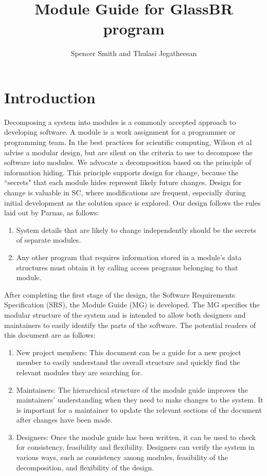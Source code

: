 \documentclass[12pt]{article}
\title{Module Guide for GlassBR program}
\author{Spencer Smith and Thulasi Jegatheesan}
\begin{document}
\maketitle
\tableofcontents
\newpage
\section{Introduction}
\label{Sec:I}
Decomposing a system into modules is a commonly accepted approach to developing software.  A module is a work assignment for a programmer or programming team. In the best practices for scientific computing, Wilson et al advise a modular design, but are silent on the criteria to use to decompose the software into modules.  We advocate a decomposition based on the principle of information hiding. This principle supports design for change, because the ``secrets" that each module hides represent likely future changes.  Design for change is valuable in SC, where modifications are frequent, especially during initial development as the solution space is explored.
Our design follows the rules laid out by Parnas, as follows:
\begin{enumerate}
\item{System details that are likely to change independently should be the secrets of separate modules.}
\item{Any other program that requires information stored in a module's data structures must obtain it by calling access programs belonging to that module.}
\end{enumerate}
After completing the first stage of the design, the Software Requirements Specification (SRS), the Module Guide (MG) is developed. The MG specifies the modular structure of the system and is intended to allow both designers and maintainers to easily identify the parts of the software.  The potential readers of this document are as follows:
\begin{enumerate}
\item{New project members: This document can be a guide for a new project member to easily understand the overall structure and quickly find the relevant modules they are searching for.}
\item{Maintainers: The hierarchical structure of the module guide improves the maintainers' understanding when they need to make changes to the system. It is important for a maintainer to update the relevant sections of the document after changes have been made.}
\item{Designers: Once the module guide has been written, it can be used to check for consistency, feasibility and flexibility. Designers can verify the system in various ways, such as consistency among modules, feasibility of the decomposition, and flexibility of the design.}
\end{enumerate}
\end{document}
